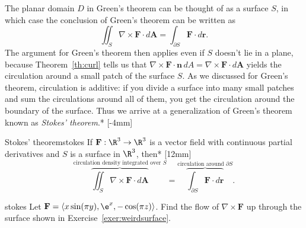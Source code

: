 \documentclass[indent]{watsonbook}
\begin{document}
The planar domain $D$ in Green's theorem can be thought of as a
surface $S$, in which case the conclusion of Green's theorem can be
written as
\[
  \iint_S \nabla \times \mathbf{F} \cdot
  {d}\mathbf{A} =
  \int_{\partial S} \mathbf{F} \cdot
  {d}\mathbf{r}.
\]
The argument for Green's theorem then applies even if $S$ doesn't lie
in a plane, because Theorem~\ref{th:curl} tells us that
$\nabla \times \mathbf{F} \cdot \mathbf{n}\,{d} A = \nabla \times \mathbf{F} \cdot {d}\mathbf{A}$ yields the circulation
around a small patch of the surface $S$. As we discussed for Green's
theorem, circulation is additive: if you divide a surface into many small patches and sum the circulations around all of them, you get the circulation around the boundary of the surface. Thus we arrive at a generalization of Green's theorem known as \textit{Stokes' theorem}.* [-4mm]

\begin{theo}{Stokes' theorem}{stokes}
  If $\mathbf{F} : \R^3 \to \R^3$ is a vector field with continuous
  partial derivatives and $S$ is a surface in $\R^3$, then*
  [12mm]
  \[
    \overbrace{\iint_S \nabla \times \mathbf{F} \cdot
      {d}\mathbf{A}}^{\text{circulation density integrated
        over $S$}} =
    \overbrace{\int_{\partial S} \mathbf{F} \cdot
      {d}\mathbf{r}}^{\text{circulation around $\partial S$}}.
  \]
\end{theo}

\begin{example}{}{stokes}
  Let $\mathbf{F} = \langle x \sin (\pi y), \e^x, -\cos(\pi z)
  \rangle$. Find the flow of $\nabla \times \mathbf{F}$ up through the
  surface shown in Exercise~\ref{exer:weirdsurface}.
\end{example}
\end{document}
